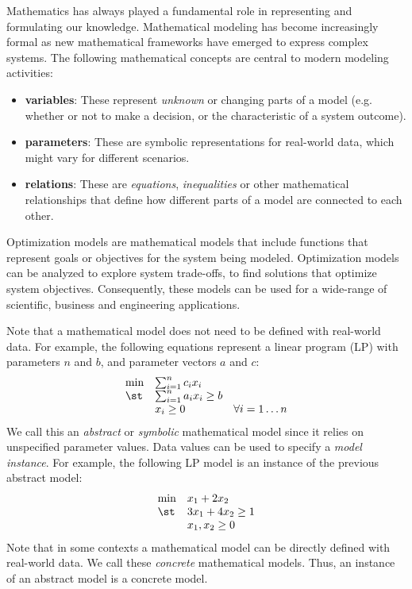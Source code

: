 Mathematics has always played a fundamental role in representing and
formulating our knowledge.  Mathematical modeling has become increasingly
formal as new mathematical frameworks have emerged to express complex
systems.  The following mathematical concepts are central to modern
modeling activities:
\begin{itemize}

\item {\bf variables}:  These represent {\em unknown} or changing parts of a model (e.g. whether or not to make a decision, or the characteristic of a system outcome).

\item {\bf parameters}:  These are symbolic representations for real-world data, which might vary for different scenarios.

\item {\bf relations}:  These are {\em equations}, {\em inequalities} or other mathematical relationships that define how different parts of a model are connected to each other.

\end{itemize}
Optimization models are mathematical models that include functions that
represent goals or objectives for the system being modeled.  
Optimization models can be analyzed to explore system
trade-offs, to find solutions that optimize system objectives.
Consequently, these models
can be used for a wide-range of scientific, business and engineering
applications. 

Note that a mathematical model does not need to be defined with real-world
data.  For example, the following equations represent a linear program
(LP)  with parameters $n$ and $b$, and parameter vectors $a$ and $c$:
\[
\begin{array}{lll}
\min & \sum_{i=1}^n c_i x_i &\\
\st & \sum_{i=1}^n a_i x_i \geq b &\\
    & x_i \geq 0 & \forall i = 1 \ldots n
\end{array}
\]
We call this an {\em abstract} or {\em symbolic} mathematical model since it relies on 
unspecified parameter values.  Data values can be used to specify a {\em model instance}.  For example, the following LP model is an instance of the previous abstract model:
\[
\begin{array}{ll}
\min & x_1 + 2 x_2\\
\st & 3 x_1 + 4 x_2 \geq 1\\
    & x_1, x_2 \geq 0
\end{array}
\]
Note that in some contexts a mathematical model can be directly defined
with real-world data.  We call these {\em concrete} mathematical models.
Thus, an instance of an abstract model is a concrete model.


